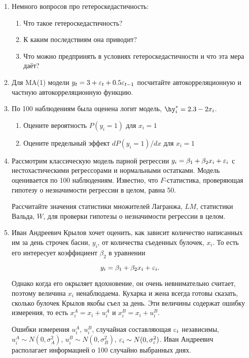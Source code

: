 \documentclass[12pt, a4paper]{article}
\theoremstyle{definition}
\begin{document}
\begin{enumerate}
\item Немного вопросов про гетероскедастичность:
\begin{enumerate}
\item Что такое гетероскедастичность?
\item К каким последствиям она приводит?
\item Что можно предпринять в условиях гетероскедастичности и что эта мера даёт?
\end{enumerate}

\item Для MA(1) модели $y_t=3+\varepsilon_t+0.5\varepsilon_{t-1}$ посчитайте автокорреляционную и частную автокорреляционную функцию.

\item По 100 наблюдениям была оценена логит модель, $\hy_i^*=2.3-2x_i$.
\begin{enumerate}
\item Оцените вероятность $P(y_i=1)$ для $x_i=1$
\item Оцените предельный эффект $dP(y_i=1)/dx$ для $x_i=1$
\end{enumerate}

\item Рассмотрим классическую модель парной регрессии $y_i=\beta_1 + \beta_2 x_i + \varepsilon_i$ с нестохастическими регрессорами и нормальными остатками. Модель оценивается по 100 наблюдениям. Известно, что $F$-статистика, проверяющая гипотезу о незначимости регрессии в целом, равна 50.

Рассчитайте значения статистики множителей Лагранжа, $LM$, статистики Вальда, $W$, для проверки гипотезы о незначимости регрессии в целом.


\item Иван Андреевич Крылов хочет оценить, как зависит количество написанных им за день строчек басни, $y_i$, от количества съеденных булочек, $x_i$. То есть его интересует коэффициент $\beta_2$ в уравнении

\[
y_i=\beta_1+\beta_2 x_i + \varepsilon_i.
\]

Однако когда его окрыляет вдохновение, он очень невнимательно считает, поэтому величина $x_i$ ненаблюдаема. Кухарка и жена всегда готовы сказать, сколько булочек Крылов якобы съел за день. Эти величины содержат ошибку измерения, то есть $x_i^A=x_i+u_i^A$ и $x_i^B=x_i+u_i^B$.

Ошибки измерения $u_i^A$, $u_i^B$, случайная составляющая $\varepsilon_i$ независимы, $u_i^A \sim N(0,\sigma^2_A)$, $u_i^B \sim N(0,\sigma^2_B)$, $\varepsilon_i \sim N(0,\sigma^2_{\varepsilon})$. Иван Андреевич располагает информацией о 100 случайно выбранных днях.


\end{enumerate}
\end{document}
